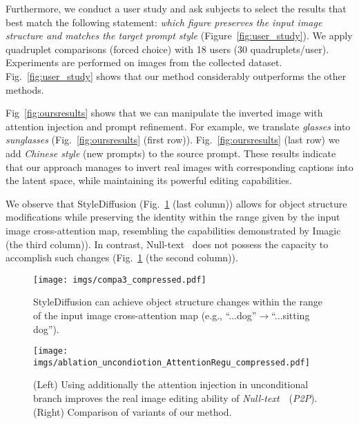 \documentclass[twocolumn]{svjour3}          \smartqed  \usepackage{graphicx}
\begin{document}
Furthermore, we conduct a user study and ask subjects to select the results that best match the following statement: \textit{which figure preserves the input image structure and matches the target prompt style} (Figure~\ref{fig:user_study}). We apply quadruplet comparisons (forced choice) with 18 users (30 quadruplets/user). Experiments are performed on images from the collected dataset. Fig.~\ref{fig:user_study} shows that our method considerably outperforms the other methods.

Fig~\ref{fig:oursresults}  shows that we can manipulate the inverted image with attention injection and prompt refinement. For example, we translate  \textit{glasses}  into \textit{sunglasses} (Fig.~\ref{fig:oursresults} (first row)). Fig.~\ref{fig:oursresults} (last row)  we  add \textit{Chinese style} (new prompts) to the source prompt. These results indicate that our approach manages to invert real images with corresponding captions into the latent space, while maintaining its powerful editing capabilities.

We observe that StyleDiffusion (Fig.~\ref{fig:compa3} (last column)) allows for object structure modifications while preserving the identity within the range given by the input image cross-attention map, resembling the capabilities demonstrated by  Imagic~\citep{Kawar2022ImagicTR} (the third column)). In contrast, Null-text~\citep{mokady2022null} does not possess the capacity to accomplish such changes (Fig.~\ref{fig:compa3} (the second column)).

\begin{figure}[t]
    \centering
    \texttt{[image: imgs/compa3\_compressed.pdf]}
        \caption{StyleDiffusion can achieve object structure changes within the range of the input image cross-attention map (e.g., “...dog”$\rightarrow$“...sitting dog”).}
    \label{fig:compa3}
    \vspace{-5mm}
\end{figure}


\begin{figure*}[t]
\centering
\texttt{[image: imgs/ablation\_uncondiotion\_AttentionRegu\_compressed.pdf]}
        \caption{
        (Left) Using additionally the attention injection in unconditional branch improves the real image editing ability of \emph{Null-text}~\citep{mokady2022null}~(\emph{P2P}). (Right) Comparison of  variants of our method.}
    \label{fig:uncondselfattn_more}
\end{figure*}
\end{document}
